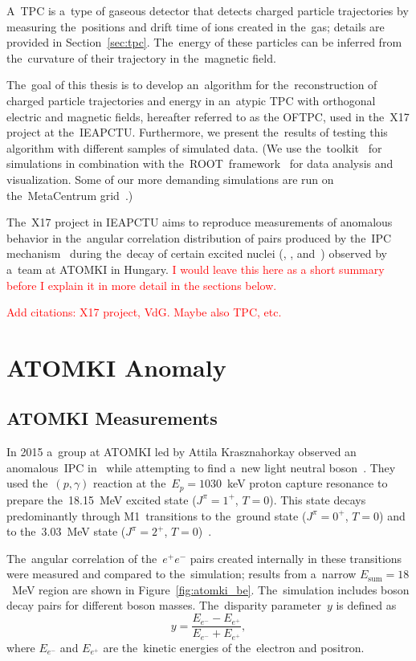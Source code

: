 	A~\ac{TPC} is a~type of gaseous detector that detects charged particle trajectories by measuring the~positions and drift time of ions created in the~gas; details are provided in Section~\ref{sec:tpc}. The~energy of these particles can be inferred from the~curvature of their trajectory in the~magnetic field.
	
	The~goal of this thesis is to develop an~algorithm for the~reconstruction of charged particle trajectories and energy in an~atypic \ac{TPC} with orthogonal electric and magnetic fields, hereafter referred to as the \ac{OFTPC}, used in the~X17 project at the~\ac{IEAPCTU}. Furthermore, we present the~results of testing this algorithm with different samples of simulated data. (We use the~\garfieldpp toolkit~\cite{Garfield++} for simulations in combination with the~ROOT~framework~\cite{ROOT} for data analysis and visualization. Some of our more demanding simulations are run on the~MetaCentrum grid~\cite{metacentrum}.)
	
	The~X17 project in \ac{IEAPCTU} aims to reproduce measurements of anomalous behavior in the~angular correlation distribution of pairs produced by the~\ac{IPC} mechanism~\cite{IPC} during the~decay of certain excited nuclei (, , and~) observed by a~team at ATOMKI in Hungary. \textcolor{red}{I would leave this here as a short summary before I explain it in more detail in the sections below.}
	
	\textcolor{red}{Add citations: X17 project, VdG. Maybe also TPC, etc.}
	
	\section{ATOMKI Anomaly}
	\label{sec:ATOMKI}
		\subsection{ATOMKI Measurements}
			In 2015 a~group at ATOMKI led by Attila Krasznahorkay observed an anomalous~\acl{IPC} in~ while attempting to find a~new light neutral boson~\cite{atomki_be}. They used the~$(p,\gamma)$ reaction at the~$E_p = 1030$~keV proton capture resonance to prepare the~18.15~MeV excited state ($J^\pi = 1^{+}$, $T=0$). This state decays predominantly through M1~transitions to the~ground state ($J^\pi = 0^{+}$, $T=0$) and to the~3.03~MeV state ($J^\pi = 2^{+}$, $T=0$)~\cite{resonances}.
			
			The~angular correlation of the~$e^+ e^-$ pairs created internally in these transitions were measured and compared to the~simulation; results from a~narrow $E_\text{sum}=18$~MeV region are shown in Figure~\ref{fig:atomki_be}. The~simulation includes boson decay pairs for different boson masses. The~disparity parameter~$y$ is defined as
				\begin{equation}
					y = \frac{E_{e^-}-E_{e^+}}{E_{e^-}+E_{e^+}},
				\end{equation}
			where $E_{e^-}$ and $E_{e^+}$ are the~kinetic energies of the~electron and positron.
			
